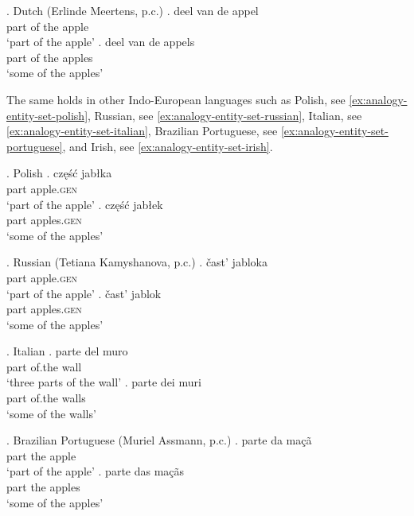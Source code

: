 \ex.\label{ex:analogy-entity-set-dutch} Dutch (Erlinde Meertens, p.c.)
    \ag. deel van de appel\label{ex:analogy-entity-dutch}\\
	part of the apple\\
	`part of the apple'
	\bg. deel van de appels\label{ex:analogy-set-dutch}\\
	part of the apples\\
	`some of the apples' 

The same holds in other Indo-European languages such as Polish, see \ref{ex:analogy-entity-set-polish}, 
Russian, see \ref{ex:analogy-entity-set-russian}, Italian, see \ref{ex:analogy-entity-set-italian}, Brazilian Portuguese, see \ref{ex:analogy-entity-set-portuguese}, and Irish, see \ref{ex:analogy-entity-set-irish}. 

    \ex.\label{ex:analogy-entity-set-polish} Polish
    \ag. część jabłka\label{ex:analogy-entity-polish}\\
	part apple\textsc{.gen}\\
 	`part of the apple'
 	\bg. część jabłek\label{ex:analogy-set-polish}\\
 	part apples\textsc{.gen}\\
 	`some of the apples'

\ex.\label{ex:analogy-entity-set-russian} Russian (Tetiana Kamyshanova, p.c.)
    \ag. čast' jabloka\label{ex:analogy-entity-russian}\\
	part apple\textsc{.gen}\\
	`part of the apple'
	\bg. čast' jablok\label{ex:analogy-set-russian}\\
	part apples\textsc{.gen}\\
	`some of the apples'    

		\ex.\label{ex:analogy-entity-set-italian} Italian \citep[p. 186; adapted]{schwarzschild1996pluralities}
        \ag. parte del muro\label{ex:analogy-entity-italian}\\
		part of.the wall\\
		`three parts of the wall'
		\bg. parte dei muri\label{ex:analogy-set-italian}\\
		part of.the walls\\
        `some of the walls'

		\ex.\label{ex:analogy-entity-set-portuguese} Brazilian Portuguese (Muriel Assmann, p.c.) 
        \ag. parte da ma{\c{c}}{\~{a}}\label{ex:analogy-entity-portuguese}\\
		part the apple\\
		`part of the apple'
		\bg. parte das ma{\c{c}}{\~{a}}s\label{ex:analogy-set-portuguese}\\
		part the apples\\
        `some of the apples'


